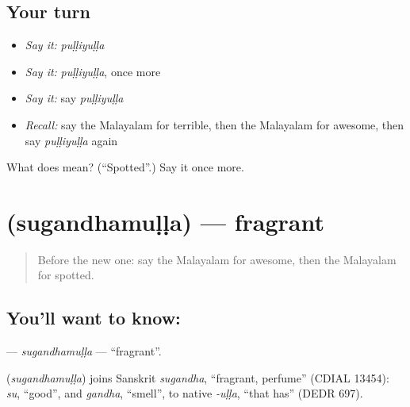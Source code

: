 \subsection*{Your turn}
\begin{itemize}
\raggedright
  \item \emph{Say it:} \emph{puḷḷiyuḷḷa}
  \item \emph{Say it:} \emph{puḷḷiyuḷḷa}, once more
  \item \emph{Say it:} say \emph{puḷḷiyuḷḷa}
  \item \emph{Recall:} say the Malayalam for terrible, then the Malayalam for awesome, then say \emph{puḷḷiyuḷḷa} again
\end{itemize}

\begin{tcolorbox}[breakable,colback=teal!4,colframe=teal!35!black,title={Before you move on}]
What does  mean? (\textquotedblleft{}Spotted\textquotedblright{}.) Say it once more.
\end{tcolorbox}
\section[\texorpdfstring{\ml{സുഗന്ധമുള്ള} (sugandhamuḷḷa)}{സുഗന്ധമുള്ള (sugandhamuḷḷa)}]{ (sugandhamuḷḷa) — fragrant}

\label{lesson:ML-C321-sugandhamulla}



\begin{quote}
Before the new one: say the Malayalam for awesome, then the Malayalam for spotted.
\end{quote}

\subsection*{You'll want to know: }
\textbf{} — \emph{sugandhamuḷḷa} — \textquotedblleft{}fragrant\textquotedblright{}.

\begin{cousinweb}
\textbf{} (\emph{sugandhamuḷḷa}) joins Sanskrit \emph{sugandha}, \textquotedblleft{}fragrant, perfume\textquotedblright{} (CDIAL 13454): \emph{su}, \textquotedblleft{}good\textquotedblright{}, and \emph{gandha}, \textquotedblleft{}smell\textquotedblright{}, to native \emph{-uḷḷa}, \textquotedblleft{}that has\textquotedblright{} (DEDR 697).
\end{cousinweb}

